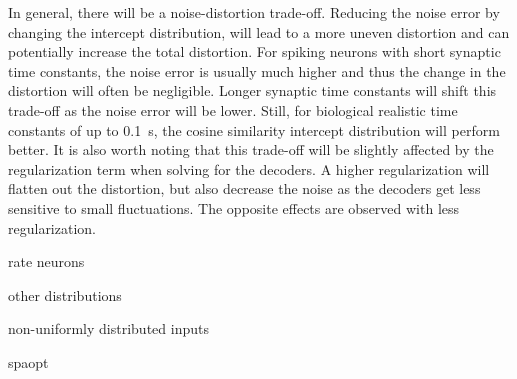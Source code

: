 In general, there will be a noise-distortion trade-off.
Reducing the noise error by changing the intercept distribution, will lead to a more uneven distortion and can potentially increase the total distortion.
For spiking neurons with short synaptic time constants, the noise error is usually much higher and thus the change in the distortion will often be negligible.
Longer synaptic time constants will shift this trade-off as the noise error will be lower.
Still, for biological realistic time constants of up to \SI{0.1}{\second}, the cosine similarity intercept distribution will perform better.
It is also worth noting that this trade-off will be slightly affected by the regularization term when solving for the decoders.
A higher regularization will flatten out the distortion, but also decrease the noise as the decoders get less sensitive to small fluctuations.
The opposite effects are observed with less regularization.

rate neurons

other distributions

non-uniformly distributed inputs

spaopt
